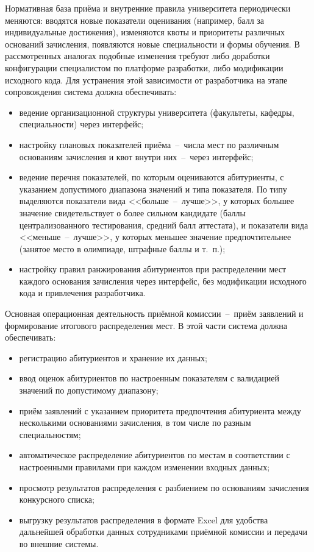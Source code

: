 Нормативная база приёма и внутренние правила университета периодически меняются: вводятся новые показатели оценивания (например, балл за индивидуальные достижения), изменяются квоты и приоритеты различных оснований зачисления, появляются новые специальности и формы обучения.
В рассмотренных аналогах подобные изменения требуют либо доработки конфигурации специалистом по платформе разработки, либо модификации исходного кода.
Для устранения этой зависимости от разработчика на этапе сопровождения система должна обеспечивать:
\begin{itemize}
\item ведение организационной структуры университета (факультеты, кафедры, специальности) через интерфейс;
\item настройку плановых показателей приёма~--~числа мест по различным основаниям зачисления и квот внутри них~--~через интерфейс;
\item ведение перечня показателей, по которым оцениваются абитуриенты, с указанием допустимого диапазона значений и типа показателя.
По типу выделяются показатели вида <<больше~--~лучше>>, у которых большее значение свидетельствует о более сильном кандидате (баллы централизованного тестирования, средний балл аттестата), и показатели вида <<меньше~--~лучше>>, у которых меньшее значение предпочтительнее (занятое место в олимпиаде, штрафные баллы и т.~п.);
\item настройку правил ранжирования абитуриентов при распределении мест каждого основания зачисления через интерфейс, без модификации исходного кода и привлечения разработчика.
\end{itemize}

Основная операционная деятельность приёмной комиссии~--~приём заявлений и формирование итогового распределения мест.
В этой части система должна обеспечивать:
\begin{itemize}
\item регистрацию абитуриентов и хранение их данных;
\item ввод оценок абитуриентов по настроенным показателям с валидацией значений по допустимому диапазону;
\item приём заявлений с указанием приоритета предпочтения абитуриента между несколькими основаниями зачисления, в том числе по разным специальностям;
\item автоматическое распределение абитуриентов по местам в соответствии с настроенными правилами при каждом изменении входных данных;
\item просмотр результатов распределения с разбиением по основаниям зачисления конкурсного списка;
\item выгрузку результатов распределения в формате Excel для удобства дальнейшей обработки данных сотрудниками приёмной комиссии и передачи во внешние системы.
\end{itemize}

